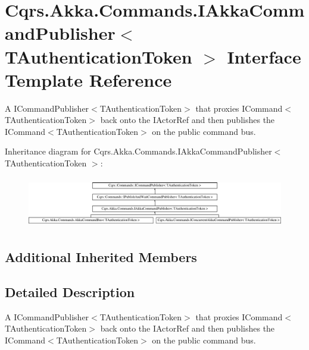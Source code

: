 \hypertarget{interfaceCqrs_1_1Akka_1_1Commands_1_1IAkkaCommandPublisher}{}\section{Cqrs.\+Akka.\+Commands.\+I\+Akka\+Command\+Publisher$<$ T\+Authentication\+Token $>$ Interface Template Reference}
\label{interfaceCqrs_1_1Akka_1_1Commands_1_1IAkkaCommandPublisher}


A I\+Command\+Publisher$<$\+T\+Authentication\+Token$>$ that proxies I\+Command$<$\+T\+Authentication\+Token$>$ back onto the I\+Actor\+Ref and then publishes the I\+Command$<$\+T\+Authentication\+Token$>$ on the public command bus.  


Inheritance diagram for Cqrs.\+Akka.\+Commands.\+I\+Akka\+Command\+Publisher$<$ T\+Authentication\+Token $>$\+:\begin{figure}[H]
\begin{center}
\leavevmode
\includegraphics[height=2.262626cm]{interfaceCqrs_1_1Akka_1_1Commands_1_1IAkkaCommandPublisher}
\end{center}
\end{figure}
\subsection*{Additional Inherited Members}


\subsection{Detailed Description}
A I\+Command\+Publisher$<$\+T\+Authentication\+Token$>$ that proxies I\+Command$<$\+T\+Authentication\+Token$>$ back onto the I\+Actor\+Ref and then publishes the I\+Command$<$\+T\+Authentication\+Token$>$ on the public command bus. 

